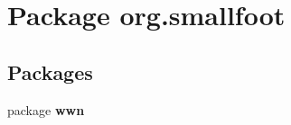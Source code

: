 \section{Package org.\-smallfoot}
\label{namespaceorg_1_1smallfoot}
\subsection*{Packages}
\begin{DoxyCompactItemize}
\item 
package {\bf wwn}
\end{DoxyCompactItemize}
